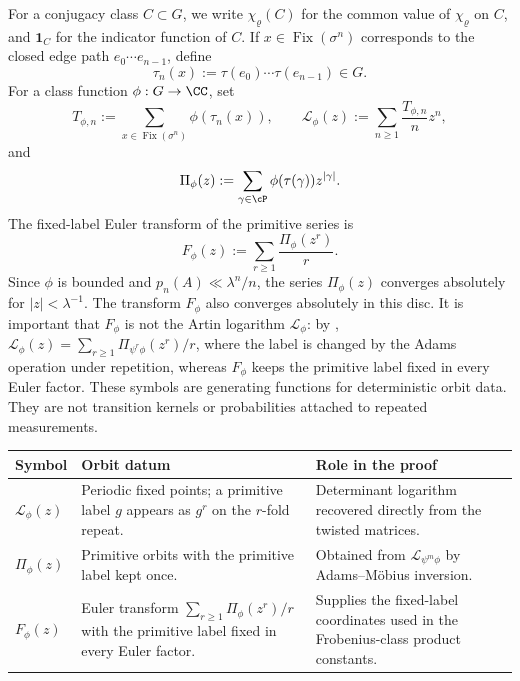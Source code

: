 For a conjugacy class \(C\subset G\), we write \(\chi_\varrho(C)\) for
the common value of \(\chi_\varrho\) on \(C\), and \(\mathbf 1_C\) for
the indicator function of \(C\). If \(x\in\operatorname{Fix}(\sigma^n)\)
corresponds to the closed edge path \(e_0\cdots e_{n-1}\), define
\[
  \tau_n(x):=\tau(e_0)\cdots\tau(e_{n-1})\in G.
\]
For a class function \(\phi:G\to\CC\), set
\begin{equation}\label{eq:class-logarithm-def}
  T_{\phi,n}:=\sum_{x\in\operatorname{Fix}(\sigma^n)}\phi(\tau_n(x)),
  \qquad
  \mathcal L_\phi(z):=\sum_{n\ge 1}\frac{T_{\phi,n}}{n}z^n,
\end{equation}
and
\begin{equation}\label{eq:primitive-class-series-def}
  \Pi_\phi(z):=\sum_{\gamma\in\cP}\phi(\tau(\gamma))z^{|\gamma|}.
\end{equation}
The fixed-label Euler transform of the primitive series is
\begin{equation}\label{eq:fixed-label-euler-transform-def}
  F_\phi(z):=\sum_{r\ge1}\frac{\Pi_\phi(z^r)}{r}.
\end{equation}
Since \(\phi\) is bounded and \(p_n(A)\ll \lambda^n/n\), the series
\(\Pi_\phi(z)\) converges absolutely for \(|z|<\lambda^{-1}\).
The transform \(F_\phi\) also converges absolutely in this disc. It is
important that \(F_\phi\) is not the Artin logarithm
\(\mathcal L_\phi\): by ,
\(\mathcal L_\phi(z)=\sum_{r\ge1}\Pi_{\psi^r\phi}(z^r)/r\), where the
label is changed by the Adams operation under repetition, whereas
\(F_\phi\) keeps the primitive label fixed in every Euler factor.
These symbols are generating functions for deterministic orbit data.
They are not transition kernels or probabilities attached to repeated
measurements.

\begin{center}
\renewcommand{\arraystretch}{1.18}
\begin{tabular}{L{0.25\textwidth}L{0.32\textwidth}L{0.34\textwidth}}
\toprule
Symbol & Orbit datum & Role in the proof \\
\midrule
\(\mathcal L_\phi(z)\)
& Periodic fixed points; a primitive label \(g\) appears as \(g^r\) on
the \(r\)-fold repeat.
& Determinant logarithm recovered directly from the twisted matrices. \\
\(\Pi_\phi(z)\)
& Primitive orbits with the primitive label kept once.
& Obtained from \(\mathcal L_{\psi^m\phi}\) by Adams--M\"obius
inversion. \\
\(F_\phi(z)\)
& Euler transform \(\sum_{r\ge1}\Pi_\phi(z^r)/r\) with the primitive label
fixed in every Euler factor.
  & Supplies the fixed-label coordinates used in the Frobenius-class product constants. \\
\bottomrule
\end{tabular}
\end{center}

